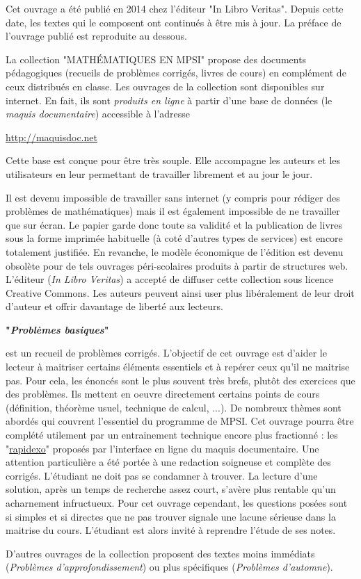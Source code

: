 Cet ouvrage a été publié en 2014 chez l'éditeur "In Libro Veritas". Depuis cette date, les textes qui le composent ont continués à être mis à jour. La préface de l'ouvrage publié est reproduite au dessous.



La collection "MATH\'EMATIQUES EN MPSI" propose des documents pédagogiques (recueils de problèmes corrigés, livres de cours) en complément de ceux distribués en classe.\newline
Les ouvrages de la collection sont  disponibles sur internet. En fait, ils sont \emph{produits en ligne} à partir d'une base de données (le \emph{maquis documentaire}) accessible à l'adresse
\begin{center}
 \href{http://maquisdoc.net}{http://maquisdoc.net}
\end{center}
Cette base est conçue pour être très souple. Elle accompagne les auteurs et les utilisateurs en leur permettant de travailler librement et au jour le jour.

Il est devenu impossible de travailler sans internet (y compris pour rédiger des problèmes de mathématiques) mais il est également impossible de ne travailler que sur écran. Le papier garde donc toute sa validité et la publication de livres sous la forme imprimée habituelle (à coté d'autres types de services) est encore totalement justifiée.\newline
En revanche, le modèle économique de l'édition est devenu obsolète pour de tels ouvrages péri-scolaires produits à partir de structures web. L'éditeur (\emph{In Libro Veritas}) a accepté de diffuser cette collection sous licence Creative Commons. Les auteurs peuvent ainsi user plus libéralement de leur droit d'auteur et offrir davantage de liberté aux lecteurs.


\begin{center}
 \textbf{"\emph{Problèmes basiques}"}
\end{center}
 est un recueil de problèmes corrigés.\newline
L'objectif de cet ouvrage est d'aider le lecteur à maitriser certains éléments essentiels et à repérer ceux qu'il ne maitrise pas. Pour cela, les énoncés sont le plus souvent très brefs, plutôt des exercices que des problèmes. Ils mettent en oeuvre directement certains points de cours (définition, théorème usuel, technique de calcul, ...). De nombreux thèmes sont abordés qui couvrent l'essentiel du programme de MPSI.  Cet ouvrage pourra être complété utilement par un entrainement technique encore plus fractionné : les "\href{http://back.maquisdoc.net/v-1/index.php?act=chvueelt&vue=vue_rap_math&id_elt=1668}{rapidexo}" proposés par l'interface en ligne du maquis documentaire.\newline
Une attention particulière a été portée à une redaction soigneuse et complète des corrigés. L'étudiant ne doit pas se condamner à trouver. La lecture d'une solution, après un temps de recherche assez court, s'avère plus rentable qu'un acharnement infructueux.\newline
Pour cet ouvrage cependant, les questions posées sont si simples et si directes que ne pas trouver signale une lacune sérieuse dans la maitrise du cours. L'étudiant est alors invité à reprendre l'étude de ses notes.


D'autres ouvrages de la collection proposent des textes moins immédiats (\emph{Problèmes d'approfondissement}) ou plus spécifiques (\emph{Problèmes d'automne}). 


 
